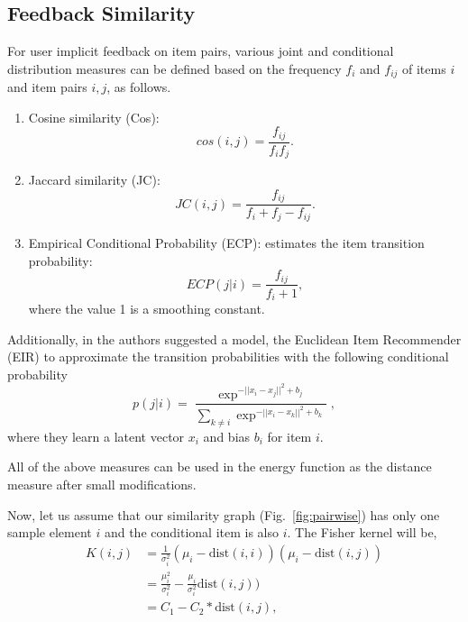 \subsection{Feedback Similarity}

For user implicit feedback on item pairs, various joint and conditional distribution measures can be defined based on the frequency $f_i$ and $f_{ij}$ of items $i$ and item pairs $i,j$, as follows.
%
\begin{enumerate}
%
\item Cosine similarity (Cos):
%
\begin{equation}
cos(i,j) = \frac{f_{ij}}{f_i f_j}.
\nonumber
\end{equation}
%
\item Jaccard similarity (JC):
%
\begin{equation}
JC(i,j) = \frac{f_{ij}}{f_i+f_j-f_{ij}}.
\nonumber
\end{equation}
%
\item Empirical Conditional Probability (ECP): estimates the item transition probability:
%
\begin{equation}
ECP(j|i) = \frac{f_{ij}}{f_i+1},
\nonumber 
\end{equation}
%
where the value 1 is a smoothing constant. 
\end{enumerate}
%
Additionally, in \cite{koenigstein2013towards} the authors suggested a model, the Euclidean Item Recommender (EIR) to approximate the transition probabilities with the following conditional probability
%
\begin{equation}
p(j | i) = \frac{\exp^{-||x_i-x_j||^2 + b_j}}{\sum_{k \neq i} \exp^{-||x_i-x_k||^2+b_k}},
\nonumber
\end{equation}
%
where they learn a latent vector $x_i$ and bias $b_i$ for item $i$. 

All of the above measures can be used in the energy function as the distance measure after small modifications. 

Now, let us assume that our similarity graph (Fig.~\ref{fig:pairwise}) has only one sample element $i$ and the conditional item is also $i$. The Fisher kernel will be,
%
\begin{equation}
\nonumber
\begin{split}
K(i,j) &= \frac{1}{\sigma_{i}^2} (\mu_i - \mbox{dist}(i,i))(\mu_i-\mbox{dist}(i,j)) \\
       &= \frac{\mu_i^2}{\sigma_{i}^2} - \frac{\mu_i}{\sigma_{i}^2} \mbox{dist}(i,j)) \\
       &= C_1-C_2*\mbox{dist}(i,j),
\end{split}
\end{equation}

